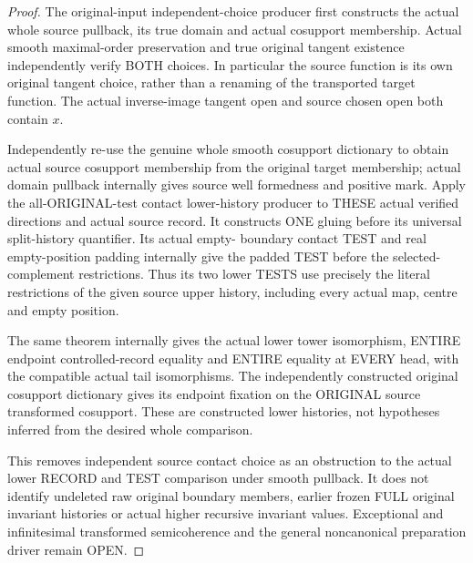 \begin{proof}
The original-input independent-choice producer first constructs the actual
whole source pullback, its true domain and actual cosupport membership.
Actual smooth maximal-order preservation and true original tangent
existence independently verify BOTH choices. In particular the source
function is its own original tangent choice, rather than a renaming of the
transported target function. The actual inverse-image tangent open and
source chosen open both contain $x$.

Independently re-use the genuine whole smooth cosupport dictionary to obtain
actual source cosupport membership from the original target membership;
actual domain pullback internally gives source well formedness and positive
mark. Apply the all-ORIGINAL-test contact lower-history producer to THESE
actual verified directions and actual source record. It constructs ONE
gluing before its universal split-history quantifier. Its actual empty-
boundary contact TEST and real empty-position padding internally give the
padded TEST before the selected-complement restrictions. Thus its two lower
TESTS use precisely the literal restrictions of the given source upper
history, including every actual map, centre and empty position.

The same theorem internally gives the actual lower tower isomorphism,
ENTIRE endpoint controlled-record equality and ENTIRE equality at EVERY
head, with the compatible actual tail isomorphisms. The independently
constructed original cosupport dictionary gives its endpoint fixation on
the ORIGINAL source transformed cosupport. These are constructed lower
histories, not hypotheses inferred from the desired whole comparison.

This removes independent source contact choice as an obstruction to the
actual lower RECORD and TEST comparison under smooth pullback. It does not
identify undeleted raw original boundary members, earlier frozen FULL
original invariant histories or actual higher recursive invariant values.
Exceptional and infinitesimal transformed semicoherence and the general
noncanonical preparation driver remain OPEN.
\end{proof}
